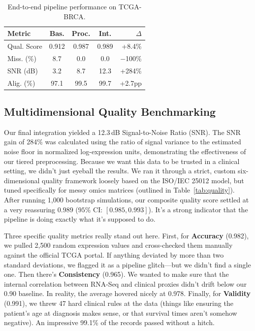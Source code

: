 \documentclass[runningheads]{llncs}
\begin{document}
\begin{table}[H]
\caption{End-to-end pipeline performance on TCGA-BRCA.}\label{tab:results}
\centering
\small
\setlength{\tabcolsep}{3pt}
\begin{tabular}{l c c c r}
\toprule
\textbf{Metric} & \textbf{Bas.} & \textbf{Proc.} & \textbf{Int.} & \textbf{$\Delta$} \\
\midrule
Qual. Score     & 0.912     & 0.987     & 0.989     & +8.4\% \\
Miss. (\%)      & 8.7       & 0.0       & 0.0       & $-$100\% \\
SNR (dB)        & 3.2       & 8.7       & 12.3      & +284\% \\
Alig. (\%)      & 97.1      & 99.5      & 99.7      & +2.7pp \\
\bottomrule
\end{tabular}
\end{table}

\subsection{Multidimensional Quality Benchmarking}
Our final integration yielded a 12.3\,dB Signal-to-Noise Ratio (SNR). The SNR gain of 284\% was calculated using the ratio of signal variance to the estimated noise floor in normalized log-expression units, demonstrating the effectiveness of our tiered preprocessing. Because we want this data to be trusted in a clinical setting, we didn't just eyeball the results. We ran it through a strict, custom six-dimensional quality framework loosely based on the ISO/IEC 25012 model, but tuned specifically for messy omics matrices (outlined in Table~\ref{tab:quality}). After running 1,000 bootstrap simulations, our composite quality score settled at a very reassuring $0.989$ ($95\%$ CI: $[0.985, 0.993]$). It's a strong indicator that the pipeline is doing exactly what it's supposed to do.

Three specific quality metrics really stand out here. First, for \textbf{Accuracy} (0.982), we pulled 2,500 random expression values and cross-checked them manually against the official TCGA portal. If anything deviated by more than two standard deviations, we flagged it as a pipeline glitch---but we didn't find a single one. Then there's \textbf{Consistency} (0.965). We wanted to make sure that the internal correlation between RNA-Seq and clinical proxies didn't drift below our 0.90 baseline. In reality, the average hovered nicely at 0.978. Finally, for \textbf{Validity} (0.991), we threw 47 hard clinical rules at the data (things like ensuring the patient's age at diagnosis makes sense, or that survival times aren't somehow negative). An impressive 99.1\% of the records passed without a hitch.
\end{document}
